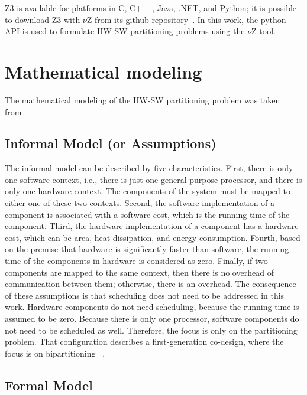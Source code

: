 Z3 is available for platforms in C, C$++$, Java, .NET, and Python; it is possible to download Z3 with $\nu$Z from its github repository~\cite{Z3API}. In this work, the python API is used to formulate HW-SW partitioning problems using the $\nu$Z tool. 

\section{Mathematical modeling}
\label{Mathematical-modeling}

The mathematical modeling of the HW-SW partitioning problem was taken from~\cite{Arato2003,Mann2007}.

\subsection{Informal Model (or Assumptions)}
\label{Informal-Model-or-Assumptions}

The informal model can be described by five characteristics. First, there is only one software context, i.e., there is just one general-purpose processor, and there is only one hardware context. The components of the system must be mapped to either one of these two contexts. Second, the software implementation of a component is associated with a software cost, which is the running time of the component. Third, the hardware implementation of a component has a hardware cost, which can be area, heat dissipation, and energy consumption. Fourth, based on the premise that hardware is significantly faster than software, the running time of the components in hardware is considered as zero. Finally, if two components are mapped to the same context, then there is no overhead of communication between them; otherwise, there is an overhead. The consequence of these assumptions is that scheduling does not need to be addressed in this work. Hardware components do not need scheduling, because the running time is assumed to be zero. Because there is only one processor, software components do not need to be scheduled as well. Therefore, the focus is only on the partitioning problem. That configuration describes a first-generation co-design, where the focus is on bipartitioning ~\cite{Teich2012}.

\subsection{Formal Model}
\label{Formal-Model}


